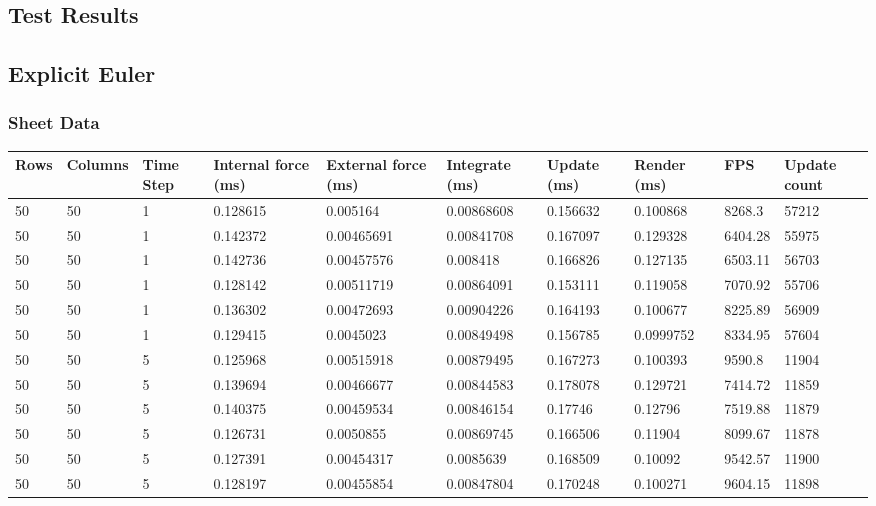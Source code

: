\begin{landscape}
\chapter{Test Results}

\section{Explicit Euler}

\subsection{Sheet Data}

\begin{longtable}{ | l | l | l | l | l | l | l | l | l | l | }
\hline
 Rows &  Columns &  Time Step &  Internal force (ms) &  External force (ms) &  Integrate (ms) &  Update (ms) &  Render (ms) &  FPS &  Update count \\ \hline
 50 & 50 & 1 & 0.128615 & 0.005164 & 0.00868608 & 0.156632 & 0.100868 & 8268.3 & 57212\\ \hline
50 & 50 & 1 & 0.142372 & 0.00465691 & 0.00841708 & 0.167097 & 0.129328 & 6404.28 & 55975\\ \hline
50 & 50 & 1 & 0.142736 & 0.00457576 & 0.008418 & 0.166826 & 0.127135 & 6503.11 & 56703\\ \hline
50 & 50 & 1 & 0.128142 & 0.00511719 & 0.00864091 & 0.153111 & 0.119058 & 7070.92 & 55706\\ \hline
50 & 50 & 1 & 0.136302 & 0.00472693 & 0.00904226 & 0.164193 & 0.100677 & 8225.89 & 56909\\ \hline
50 & 50 & 1 & 0.129415 & 0.0045023 & 0.00849498 & 0.156785 & 0.0999752 & 8334.95 & 57604\\ \hline
50 & 50 & 5 & 0.125968 & 0.00515918 & 0.00879495 & 0.167273 & 0.100393 & 9590.8 & 11904\\ \hline
50 & 50 & 5 & 0.139694 & 0.00466677 & 0.00844583 & 0.178078 & 0.129721 & 7414.72 & 11859\\ \hline
50 & 50 & 5 & 0.140375 & 0.00459534 & 0.00846154 & 0.17746 & 0.12796 & 7519.88 & 11879\\ \hline
50 & 50 & 5 & 0.126731 & 0.0050855 & 0.00869745 & 0.166506 & 0.11904 & 8099.67 & 11878\\ \hline
50 & 50 & 5 & 0.127391 & 0.00454317 & 0.0085639 & 0.168509 & 0.10092 & 9542.57 & 11900\\ \hline
50 & 50 & 5 & 0.128197 & 0.00455854 & 0.00847804 & 0.170248 & 0.100271 & 9604.15 & 11898\\ \hline

\end{longtable}
\end{landscape}
